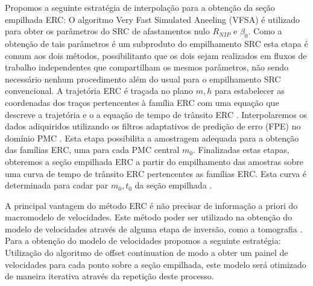 Propomos a seguinte estratégia de interpolação para a obtenção da seção empilhada ERC:
O algoritmo Very Fast Simulated Aneeling (VFSA) é utilizado para obter os parâmetros do SRC de afastamentos nulo
$R_{NIP}$ e $\beta_0$. Como a obtenção de tais parâmetros é um subproduto do empilhamento SRC esta etapa é comum
aos dois métodos, possibilitanto que os dois sejam realizados em fluxos de trabalho independentes que compartilham os 
mesmos parâmetros, não sendo necessário nenhum procedimento além do usual para o empilhamento SRC convencional.
A trajetória ERC é traçada no plano $m, h$ para estabelecer as coordenadas dos traços pertencentes à família ERC
com uma equação que descreve a trajetória e o a equação de tempo de trânsito ERC \cite{cre}.
Interpolaremos os dados adiquiridos utilizando os filtros adaptativos de predição de erro (FPE) no domínio PMC \cite{liu11}.
Esta etapa possibilita a amostragem adequada para a obtenção das famílias ERC,
uma para cada PMC central $m_0$. 
Finalizadas estas etapas,
obteremos a seção empilhada ERC a partir do empilhamento das amostras sobre uma curva de tempo de trânsito ERC 
pertencentes as famílias ERC. Esta curva é determinada para cadar par $m_0, t_0$ da seção empilhada \cite{cre}.

A principal vantagem do método ERC é não precisar de informação a priori do macromodelo de velocidades. 
Este método poder ser utilizado na obtenção do modelo de velocidades através de alguma etapa de inversão,
como a tomografia \cite{cre}. Para a obtenção do modelo de velocidades propomos a seguinte estratégia:
Utilização do algoritmo de offset continuation de modo a obter um painel de velocidades para cada ponto sobre a seção
empilhada, este modelo será otimizado de maneira iterativa através da repetição deste processo.







